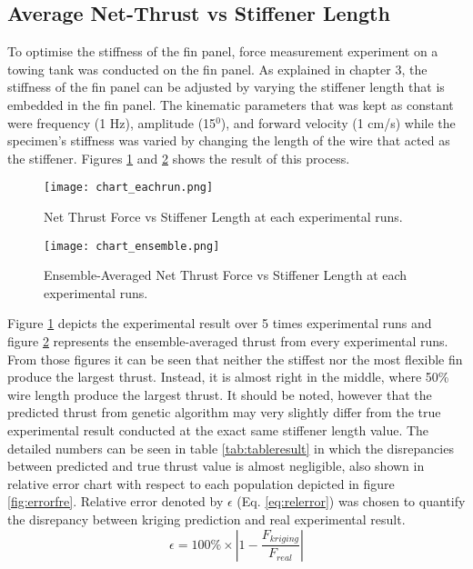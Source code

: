 \subsection{Average Net-Thrust vs Stiffener Length}
To optimise the stiffness of the fin panel, force measurement experiment on a towing tank was conducted on the fin panel. As explained in chapter 3, the stiffness of the fin panel can be adjusted by varying the stiffener length that is embedded in the fin panel. The kinematic parameters that was kept as constant were frequency (1 Hz), amplitude (15$^{0}$), and forward velocity (1 cm/s) while the specimen's stiffness was varied by changing the length of the wire that acted as the stiffener. Figures \ref{fig:charteachrun} and \ref{fig:chartensemble} shows the result of this process.\par
\begin{figure}[H]
    \centering
    \texttt{[image: chart\_eachrun.png]}
    \caption{Net Thrust Force vs Stiffener Length at each experimental runs.}
    \label{fig:charteachrun}
\end{figure}
\begin{figure}[H]
    \centering
    \texttt{[image: chart\_ensemble.png]}
    \caption{Ensemble-Averaged Net Thrust Force vs Stiffener Length at each experimental runs.}
    \label{fig:chartensemble}
\end{figure}
Figure \ref{fig:charteachrun} depicts the experimental result over 5 times experimental runs and figure \ref{fig:chartensemble} represents the ensemble-averaged thrust from every experimental runs. From those figures it can be seen that neither the stiffest nor the most flexible fin produce the largest thrust. Instead, it is almost right in the middle, where 50\% wire length produce the largest thrust. It should be noted, however that the predicted thrust from genetic algorithm may very slightly differ from the true experimental result conducted at the exact same stiffener length value. The detailed numbers can be seen in table \ref{tab:tableresult} in which the disrepancies between predicted and true thrust value is almost negligible, also shown in relative error chart with respect to each population depicted in figure \ref{fig:errorfre}. Relative error denoted by $\epsilon$ (Eq. \ref{eq:relerror}) was chosen to quantify the disrepancy between kriging prediction and real experimental result.
\begin{equation}
    \epsilon = 100\% \times \left\lvert 1 - \frac{F_{kriging}}{F_{real}}\right\rvert
    \label{eq:relerror}
\end{equation}
